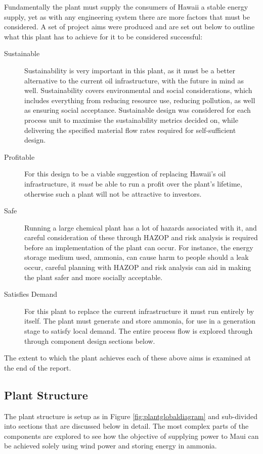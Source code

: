 Fundamentally the plant must supply the consumers of Hawaii a stable energy supply, yet as with any engineering system there are more factors that must be considered. 
A set of project aims were produced and are set out below to outline what this plant has to achieve for it to be considered successful:
\begin{description}
        \item[Sustainable]{Sustainability is very important in this plant, as it must be a better alternative to the current oil infrastructure, with the future in mind as well. Sustainability covers environmental and social considerations, which includes everything from reducing resource use, reducing pollution, as well as ensuring social acceptance. Sustainable design was considered for each process unit to maximise the sustainability metrics decided on, while delivering the specified material flow rates required for self-sufficient design.}
        \item[Profitable]{For this design to be a viable suggestion of replacing Hawaii's oil infrastructure, it \emph{must} be able to run a profit over the plant's lifetime, otherwise such a plant will not be attractive to investors.}
        \item[Safe]{Running a large chemical plant has a lot of hazards associated with it, and careful consideration of these through HAZOP and risk analysis is required before an implementation of the plant can occur. For instance, the energy storage medium used, ammonia, can cause harm to people should a leak occur, careful planning with HAZOP and risk analysis can aid in making the plant safer and more socially acceptable.}
        \item[Satisfies Demand]{For this plant to replace the current infrastructure it must run entirely by itself. The plant must generate and store ammonia, for use in a generation stage to satisfy local demand. The entire process flow is explored through through component design sections below.}
\end{description}
The extent to which the plant achieves each of these above aims is examined at the end of the report.

\subsection{Plant Structure}

The plant structure is setup as in Figure \ref{fig:plantglobaldiagram} and sub-divided into sections that are discussed below in detail.
The most complex parts of the components are explored to see how the objective of supplying power to Maui can be achieved solely using wind power and storing energy in ammonia.

